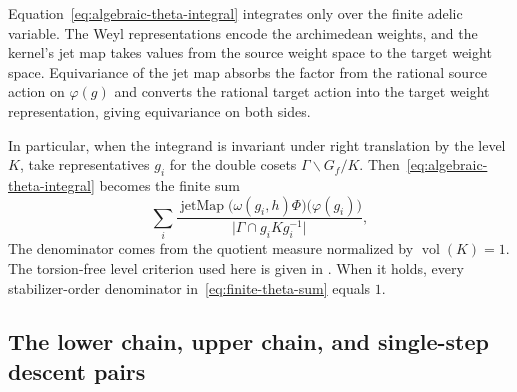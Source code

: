 Equation~\eqref{eq:algebraic-theta-integral} integrates only over the finite adelic variable. The Weyl representations encode the archimedean weights, and the kernel's jet map takes values from the source weight space to the target weight space. Equivariance of the jet map absorbs the factor from the rational source action on $\varphi(g)$ and converts the rational target action into the target weight representation, giving equivariance on both sides.

In particular, when the integrand is invariant under right translation by the level $K$, take representatives $g_i$ for the double cosets $\Gamma\backslash G_f/K$. Then~\eqref{eq:algebraic-theta-integral} becomes the finite sum
\begin{equation}
 \sum_i
 \frac{\operatorname{jetMap}\bigl(\omega(g_i,h)\Phi\bigr)\bigl(\varphi(g_i)\bigr)}
 {\lvert\Gamma\cap g_i K g_i^{-1}\rvert},
 \label{eq:finite-theta-sum}
\end{equation}
The denominator comes from the quotient measure normalized by $\operatorname{vol}(K)=1$. The torsion-free level criterion used here is given in . When it holds, every stabilizer-order denominator in~\eqref{eq:finite-theta-sum} equals $1$.

\subsection{The lower chain, upper chain, and single-step descent pairs}

